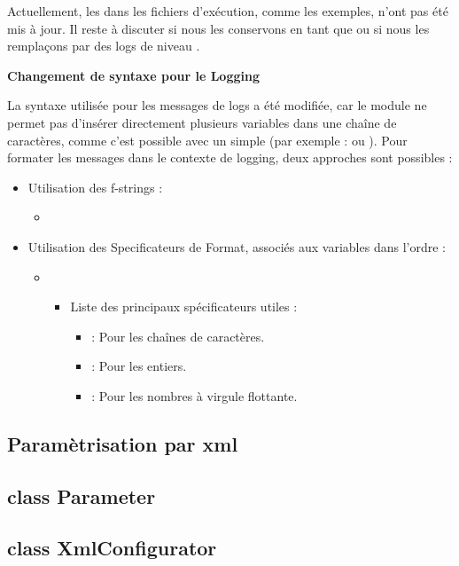 \vspace{1em}

Actuellement, les  dans les fichiers d'exécution, comme les exemples, n'ont pas été mis à jour. Il reste à discuter si nous les conservons en tant que  ou si nous les remplaçons par des logs de niveau .

\vspace{1em}

\noindent\textbf{Changement de syntaxe pour le Logging}

La syntaxe utilisée pour les messages de logs a été modifiée, car le module  ne permet pas d'insérer directement plusieurs variables dans une chaîne de caractères, comme c'est possible avec un simple  (par exemple :  ou ). Pour formater les messages dans le contexte de logging, deux approches sont possibles :
\begin{itemize}[leftmargin=1.5cm]
    \item Utilisation des f-strings :
        \begin{itemize}
            \item {}
        \end{itemize}
    \item Utilisation des Specificateurs de Format, associés aux variables dans l'ordre :
        \begin{itemize}
            \item {}
                \begin{itemize}
                    \item Liste des principaux spécificateurs utiles :
                        \begin{itemize}
                            \item {} : Pour les chaînes de caractères.
                            \item {} : Pour les entiers.
                            \item {} : Pour les nombres à virgule flottante.
                        \end{itemize}
                \end{itemize}
        \end{itemize}
\end{itemize}

\subsection{Paramètrisation par xml}
\label{sec:parametrisation_xml}

\subsection{class Parameter}
\label{sec:class_parameter}

\subsection{class XmlConfigurator}
\label{sec:class_xml_configurator}

